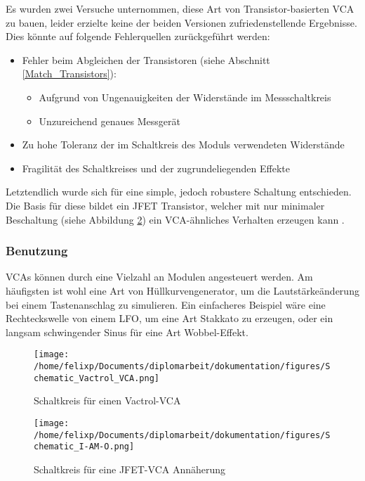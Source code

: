 \newpage

Es wurden zwei Versuche unternommen, diese Art von Transistor-basierten VCA \cite{klein:vca} zu bauen, leider erzielte keine der beiden Versionen zufriedenstellende Ergebnisse. Dies könnte auf folgende Fehlerquellen zurückgeführt werden:
\begin{itemize}
\item Fehler beim Abgleichen der Transistoren (siehe Abschnitt \ref{Match_Transistors}):
\begin{itemize}
\item Aufgrund von Ungenauigkeiten der Widerstände im Messschaltkreis
\item Unzureichend genaues Messgerät
\end{itemize}
\item Zu hohe Toleranz der im Schaltkreis des Moduls verwendeten Widerstände
\item Fragilität des Schaltkreises und der zugrundeliegenden Effekte
\end{itemize}

Letztendlich wurde sich für eine simple, jedoch robustere Schaltung entschieden. Die Basis für diese bildet ein JFET Transistor, welcher mit nur minimaler Beschaltung (siehe Abbildung \ref{fig:org0f67e97}) ein \ac{VCA}-ähnliches Verhalten erzeugen kann \cite{miaw:vcg}. 

\subsubsection{Benutzung}
\label{sec:orgf761684}
\acp{VCA} können durch eine Vielzahl an Modulen angesteuert werden. Am häufigsten ist wohl eine Art von Hüllkurvengenerator, um die Lautstärkeänderung bei einem Tastenanschlag zu simulieren. Ein einfacheres Beispiel wäre eine Rechteckswelle von einem LFO, um eine Art Stakkato zu erzeugen, oder ein langsam schwingender Sinus für eine Art Wobbel-Effekt.

\begin{figure}[hp]
\centering
\texttt{[image: /home/felixp/Documents/diplomarbeit/dokumentation/figures/Schematic\_Vactrol\_VCA.png]}
\caption{\label{fig:orgf9acbe5}Schaltkreis für einen Vactrol-VCA \cite{miaw:vca}}
\end{figure}

\begin{figure}[hp]
\centering
\texttt{[image: /home/felixp/Documents/diplomarbeit/dokumentation/figures/Schematic\_I-AM-O.png]}
\caption{\label{fig:org0f67e97}Schaltkreis für eine JFET-VCA Annäherung}
\end{figure}

